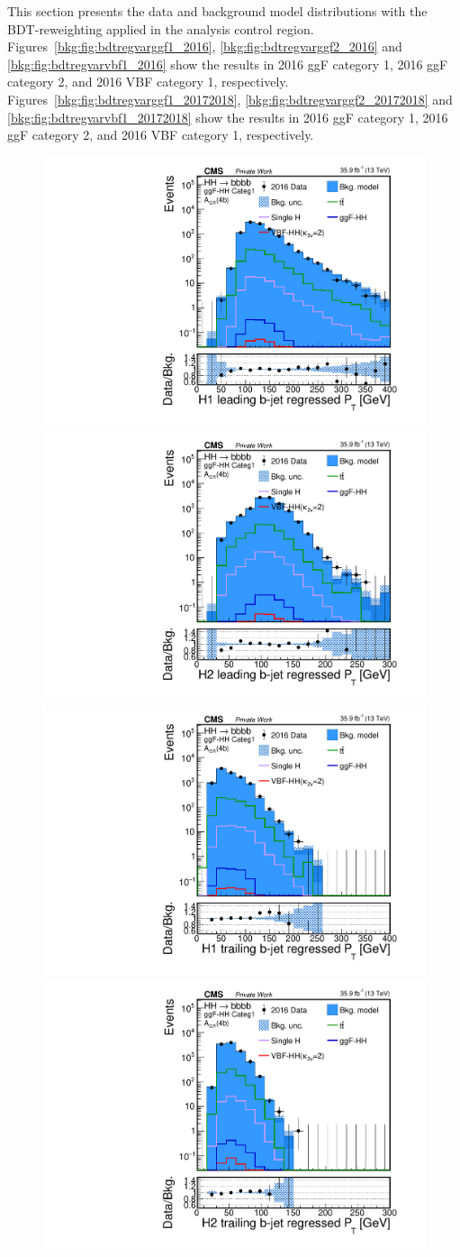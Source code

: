 This section presents the data and background model distributions with the BDT-reweighting applied in the analysis control region. Figures~\ref{bkg:fig:bdtregvarggf1_2016}, \ref{bkg:fig:bdtregvarggf2_2016} and \ref{bkg:fig:bdtregvarvbf1_2016} show the results in 2016 ggF category 1, 2016 ggF category 2, and 2016 VBF category 1, respectively. Figures~\ref{bkg:fig:bdtregvarggf1_20172018}, \ref{bkg:fig:bdtregvarggf2_20172018} and \ref{bkg:fig:bdtregvarvbf1_20172018} show the results in 2016 ggF category 1, 2016 ggF category 2, and 2016 VBF category 1, respectively.

\begin{figure}[htbp!]
\begin{center}
\includegraphics[width=0.24\linewidth]{Figures/Modeling/background/plotsDatadrivenWithBDT/2016/GGFcateg1_CR_110/Histogram/plot2016_H1_b1_ptRegressed_Btag4_GGFcateg1_CR_110_Histogram_log.pdf}
\includegraphics[width=0.24\linewidth]{Figures/Modeling/background/plotsDatadrivenWithBDT/2016/GGFcateg1_CR_110/Histogram/plot2016_H2_b1_ptRegressed_Btag4_GGFcateg1_CR_110_Histogram_log.pdf}
\includegraphics[width=0.24\linewidth]{Figures/Modeling/background/plotsDatadrivenWithBDT/2016/GGFcateg1_CR_110/Histogram/plot2016_H1_b2_ptRegressed_Btag4_GGFcateg1_CR_110_Histogram_log.pdf}
\includegraphics[width=0.24\linewidth]{Figures/Modeling/background/plotsDatadrivenWithBDT/2016/GGFcateg1_CR_110/Histogram/plot2016_H2_b2_ptRegressed_Btag4_GGFcateg1_CR_110_Histogram_log.pdf}\\

\end{center}
\end{figure}

